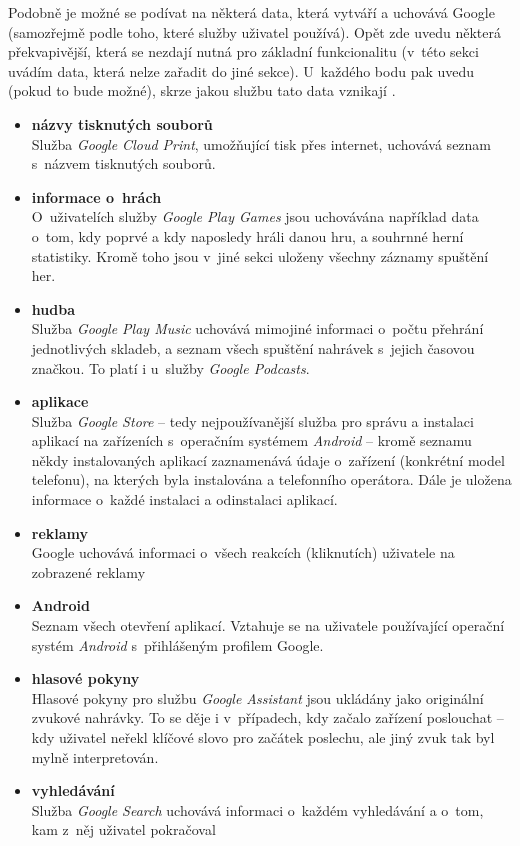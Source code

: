 Podobně je možné se podívat na některá data, která vytváří a uchovává Google (samozřejmě podle toho, které služby uživatel používá). Opět zde uvedu některá překvapivější, která se nezdají nutná pro základní funkcionalitu (v~této sekci uvádím data, která nelze zařadit do jiné sekce).
U~každého bodu pak uvedu (pokud to bude možné), skrze jakou službu tato data vznikají .

\begin{itemize}
	\item \textbf{názvy tisknutých souborů}\\
	Služba \textit{Google Cloud Print}, umožňující tisk přes internet, uchovává seznam s~názvem tisknutých souborů.

	\item \textbf{informace o~hrách}\\
	O~uživatelích služby \textit{Google Play Games} jsou uchovávána například data o~tom, kdy poprvé a kdy naposledy hráli danou hru, a souhrnné herní statistiky. Kromě toho jsou v~jiné sekci uloženy všechny záznamy spuštění her. 

	\item \textbf{hudba}\\
	Služba \textit{Google Play Music} uchovává mimojiné informaci o~počtu přehrání jednotlivých skladeb, a seznam všech spuštění nahrávek s~jejich časovou značkou. To platí i u~služby \textit{Google Podcasts}.

	\item \textbf{aplikace}\\
	Služba \textit{Google Store} -- tedy nejpoužívanější služba pro správu a instalaci aplikací na zařízeních s~operačním systémem \textit{Android} -- kromě seznamu někdy instalovaných aplikací zaznamenává údaje o~zařízení (konkrétní model telefonu), na kterých byla instalována a telefonního operátora. Dále je uložena informace o~každé instalaci a odinstalaci aplikací.
	
	\item \textbf{reklamy}\\
	Google uchovává informaci o~všech reakcích (kliknutích) uživatele na zobrazené reklamy

	\item \textbf{Android}\\
	Seznam všech otevření aplikací. Vztahuje se na uživatele používající operační systém \textit{Android} s~přihlášeným profilem Google. 

	\item \textbf{hlasové pokyny}\\
	Hlasové pokyny pro službu \textit{Google Assistant} jsou ukládány jako originální zvukové nahrávky. To se děje i v~případech, kdy začalo zařízení poslouchat  -- kdy uživatel neřekl klíčové slovo pro začátek poslechu, ale jiný zvuk tak byl mylně interpretován. 

	\item \textbf{vyhledávání}\\
	Služba \textit{Google Search} uchovává informaci o~každém vyhledávání a o~tom, kam z~něj uživatel pokračoval
\end{itemize}


